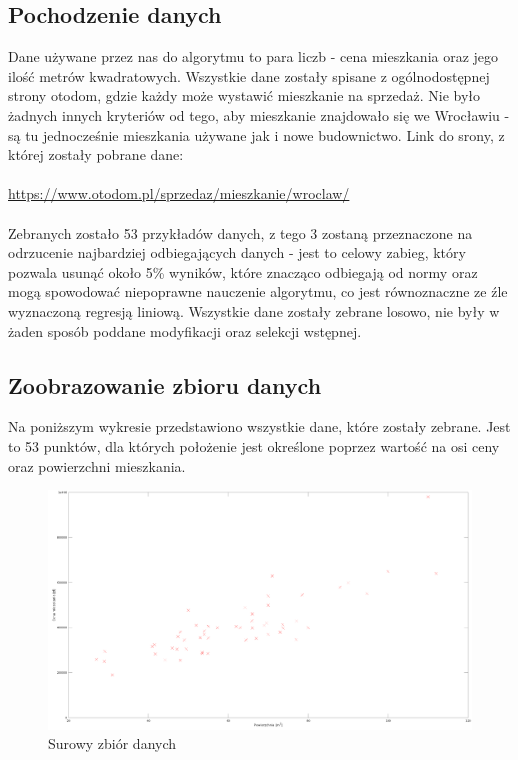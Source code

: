 	\subsection{Pochodzenie danych}
Dane używane przez nas do algorytmu to para liczb - cena mieszkania oraz jego ilość metrów kwadratowych. Wszystkie dane zostały spisane z ogólnodostępnej strony otodom, gdzie każdy może wystawić mieszkanie na sprzedaż. Nie było żadnych innych kryteriów od tego, aby mieszkanie znajdowało się we Wrocławiu - są tu jednocześnie mieszkania używane jak i nowe budownictwo. Link do srony, z której zostały pobrane dane:
\\
\\
\url{https://www.otodom.pl/sprzedaz/mieszkanie/wroclaw/}
\\
\\
Zebranych zostało 53 przykładów danych, z tego 3 zostaną przeznaczone na odrzucenie najbardziej odbiegających danych - jest to celowy zabieg, który pozwala usunąć około 5\% wyników, które znacząco odbiegają od normy oraz mogą spowodować niepoprawne nauczenie algorytmu, co jest równoznaczne ze źle wyznaczoną regresją liniową. Wszystkie dane zostały zebrane losowo, nie były w żaden sposób poddane modyfikacji oraz selekcji wstępnej.
	\subsection{Zoobrazowanie zbioru danych}
Na poniższym wykresie przedstawiono wszystkie dane, które zostały zebrane. Jest to 53 punktów, dla których położenie jest określone poprzez wartość na osi ceny oraz powierzchni mieszkania.

	\begin{figure}[H]
    \centering
    \includegraphics[scale=0.24]{PNG/y_X.png}
    \caption{Surowy zbiór danych}
    \label{lamana}
	\end{figure}
	
